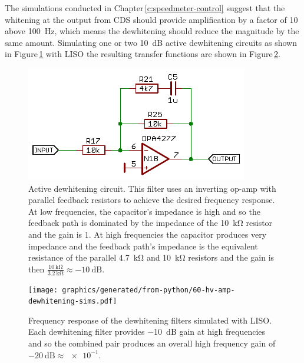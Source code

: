 The simulations conducted in Chapter\,\ref{c:speedmeter-control} suggest that the whitening at the output from \gls{CDS} should provide amplification by a factor of \num{10} above \SI{100}{\hertz}, which means the dewhitening should reduce the magnitude by the same amount. Simulating one or two \SI{10}{\deci\bel} active dewhitening circuits as shown in Figure\,\ref{fig:hv-amp-dewhitening-circuit} with \gls{LISO} the resulting transfer functions are shown in Figure\,\ref{fig:hv-amp-dewhitening-sims}.

\begin{figure}
  \centering
  \includegraphics[width=\columnwidth]{graphics/60-hv-amp-dewhitening.pdf}
  \caption[Active dewhitening circuit]{Active dewhitening circuit. This filter uses an inverting op-amp with parallel feedback resistors to achieve the desired frequency response. At low frequencies, the capacitor's impedance is high and so the feedback path is dominated by the impedance of the \SI{10}{\kilo\ohm} resistor and the gain is \num{1}. At high frequencies the capacitor produces very impedance and the feedback path's impedance is the equivalent resistance of the parallel \SI{4.7}{\kilo\ohm} and \SI{10}{\kilo\ohm} resistors and the gain is then $\frac{\SI{10}{\kilo\ohm}}{\SI{3.2}{\kilo\ohm}} \approx \SI{-10}{\deci\bel}$.}
  \label{fig:hv-amp-dewhitening-circuit}
\end{figure}

\begin{figure}
  \centering
  \texttt{[image: graphics/generated/from-python/60-hv-amp-dewhitening-sims.pdf]}
  \caption[Simulated dewhitening filter frequency response]{Frequency response of the dewhitening filters simulated with \gls{LISO}. Each dewhitening filter provides \SI{-10}{\deci\bel} gain at high frequencies and so the combined pair produces an overall high frequency gain of $\SI{-20}{\deci\bel} \approx \num{e-1}$.}
  \label{fig:hv-amp-dewhitening-sims}
\end{figure}

